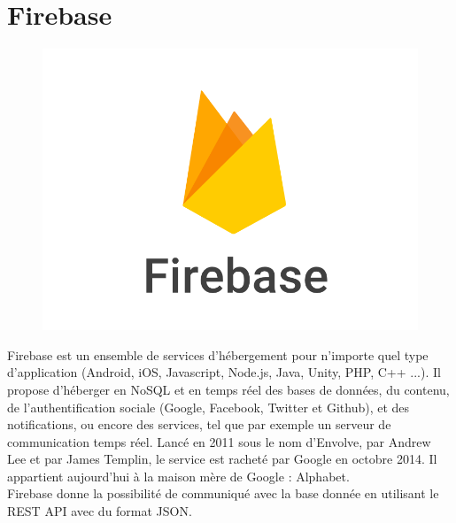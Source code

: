 \documentclass[12pt,a4paper]{report}
\begin{document}

		\newpage

		\section{Firebase}
		\begin{figure}
		\includegraphics[scale=0.15]{./graphics/firebase.png}
		\end{figure}
Firebase est un ensemble de services d'hébergement pour n'importe quel type d'application (Android, iOS, Javascript, Node.js, Java, Unity, PHP, C++ ...). Il propose d'héberger en NoSQL et en temps réel des bases de données, du contenu, de l'authentification sociale (Google, Facebook, Twitter et Github), et des notifications, ou encore des services, tel que par exemple un serveur de communication temps réel. Lancé en 2011 sous le nom d'Envolve, par Andrew Lee et par James Templin, le service est racheté par Google en octobre 2014. Il appartient aujourd'hui à la maison mère de Google : Alphabet.\\
Firebase donne la possibilité de communiqué avec la base donnée en utilisant le REST API avec du format JSON.


\end{document}
